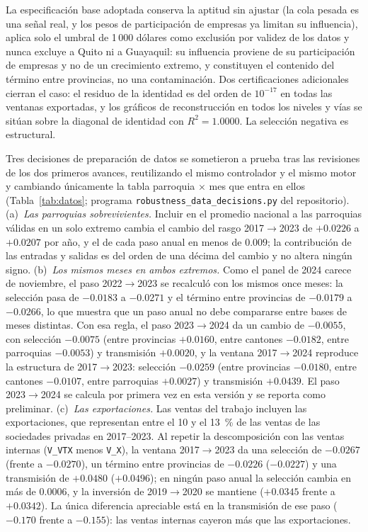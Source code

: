 \documentclass[12pt,a4paper]{article}
\begin{document}
La especificación base adoptada conserva la aptitud sin ajustar (la cola pesada es una señal real, y los pesos de participación de empresas ya limitan su influencia), aplica solo el umbral de 1\,000 dólares como exclusión por validez de los datos y nunca excluye a Quito ni a Guayaquil: su influencia proviene de su participación de empresas y no de un crecimiento extremo, y constituyen el contenido del término entre provincias, no una contaminación. Dos certificaciones adicionales cierran el caso: el residuo de la identidad es del orden de $10^{-17}$ en todas las ventanas exportadas, y los gráficos de reconstrucción en todos los niveles y vías se sitúan sobre la diagonal de identidad con $R^2 = 1.0000$. La selección negativa es estructural.
\par\vspace{6pt}
Tres decisiones de preparación de datos se sometieron a prueba tras las revisiones de los dos primeros avances, reutilizando el mismo controlador y el mismo motor y cambiando únicamente la tabla parroquia $\times$ mes que entra en ellos (Tabla~\ref{tab:datos}; programa \texttt{robustness\_data\_decisions.py} del repositorio). (a)~\textit{Las parroquias sobrevivientes.} Incluir en el promedio nacional a las parroquias válidas en un solo extremo cambia el cambio del rasgo 2017$\to$2023 de $+0.0226$ a $+0.0207$ por año, y el de cada paso anual en menos de $0.009$; la contribución de las entradas y salidas es del orden de una décima del cambio y no altera ningún signo. (b)~\textit{Los mismos meses en ambos extremos.} Como el panel de 2024 carece de noviembre, el paso 2022$\to$2023 se recalculó con los mismos once meses: la selección pasa de $-0.0183$ a $-0.0271$ y el término entre provincias de $-0.0179$ a $-0.0266$, lo que muestra que un paso anual no debe compararse entre bases de meses distintas. Con esa regla, el paso 2023$\to$2024 da un cambio de $-0.0055$, con selección $-0.0075$ (entre provincias $+0.0160$, entre cantones $-0.0182$, entre parroquias $-0.0053$) y transmisión $+0.0020$, y la ventana 2017$\to$2024 reproduce la estructura de 2017$\to$2023: selección $-0.0259$ (entre provincias $-0.0180$, entre cantones $-0.0107$, entre parroquias $+0.0027$) y transmisión $+0.0439$. El paso 2023$\to$2024 se calcula por primera vez en esta versión y se reporta como preliminar. (c)~\textit{Las exportaciones.} Las ventas del trabajo incluyen las exportaciones, que representan entre el 10 y el 13~\% de las ventas de las sociedades privadas en 2017--2023. Al repetir la descomposición con las ventas internas (\texttt{V\_VTX} menos \texttt{V\_X}), la ventana 2017$\to$2023 da una selección de $-0.0267$ (frente a $-0.0270$), un término entre provincias de $-0.0226$ ($-0.0227$) y una transmisión de $+0.0480$ ($+0.0496$); en ningún paso anual la selección cambia en más de $0.0006$, y la inversión de 2019$\to$2020 se mantiene ($+0.0345$ frente a $+0.0342$). La única diferencia apreciable está en la transmisión de ese paso ($-0.170$ frente a $-0.155$): las ventas internas cayeron más que las exportaciones.
\par
\end{document}
